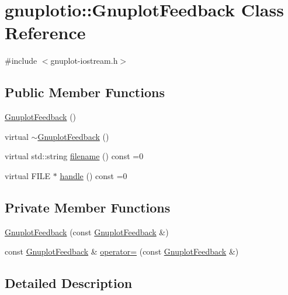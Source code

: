 \hypertarget{classgnuplotio_1_1_gnuplot_feedback}{}\section{gnuplotio\+:\+:Gnuplot\+Feedback Class Reference}
\label{classgnuplotio_1_1_gnuplot_feedback}


{\ttfamily \#include $<$gnuplot-\/iostream.\+h$>$}

\subsection*{Public Member Functions}
\begin{DoxyCompactItemize}
\item 
\hyperlink{classgnuplotio_1_1_gnuplot_feedback_ad03d9a9fde314af659f260adc60b8583}{Gnuplot\+Feedback} ()
\item 
virtual \hyperlink{classgnuplotio_1_1_gnuplot_feedback_aad7d8173d2cef257c42dea7e5b5d2aaf}{$\sim$\+Gnuplot\+Feedback} ()
\item 
virtual std\+::string \hyperlink{classgnuplotio_1_1_gnuplot_feedback_a081d4d59ffd81e2322c07c0a802e1307}{filename} () const =0
\item 
virtual F\+I\+LE $\ast$ \hyperlink{classgnuplotio_1_1_gnuplot_feedback_a13ae87ba489bfbe87f64b8b54e8a4563}{handle} () const =0
\end{DoxyCompactItemize}
\subsection*{Private Member Functions}
\begin{DoxyCompactItemize}
\item 
\hyperlink{classgnuplotio_1_1_gnuplot_feedback_a9757d465e4f83acd2adb5132f20fb0ff}{Gnuplot\+Feedback} (const \hyperlink{classgnuplotio_1_1_gnuplot_feedback}{Gnuplot\+Feedback} \&)
\item 
const \hyperlink{classgnuplotio_1_1_gnuplot_feedback}{Gnuplot\+Feedback} \& \hyperlink{classgnuplotio_1_1_gnuplot_feedback_a5ac331bbedeb44701b35965963ea0510}{operator=} (const \hyperlink{classgnuplotio_1_1_gnuplot_feedback}{Gnuplot\+Feedback} \&)
\end{DoxyCompactItemize}


\subsection{Detailed Description}


